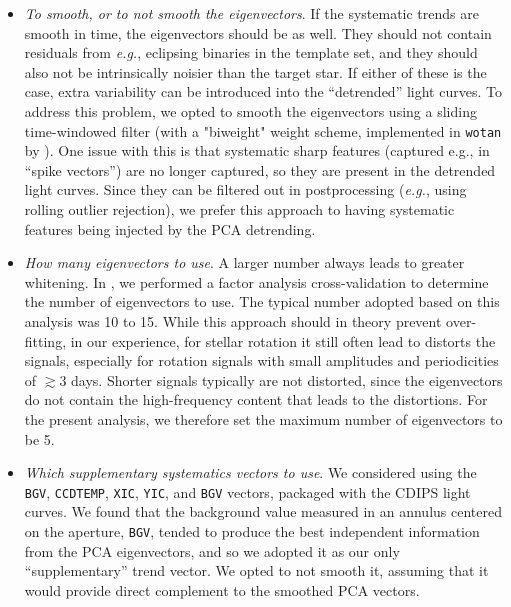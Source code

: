 \documentclass[12pt,twocolumn,tighten]{aastex63}
\begin{document}
\begin{itemize}
  \item {\it To smooth, or to not smooth the eigenvectors}.
    If the systematic trends are smooth in time, the eigenvectors should be as well. They should not
    contain residuals from {\it e.g.}, eclipsing binaries 
    in the template set, and they should also not be
    intrinsically noisier than the target star. If either of these is
    the case, extra
    variability can be introduced into the ``detrended'' light curves.  To address
    this problem, we opted to smooth the eigenvectors using a
    sliding time-windowed filter (with a "biweight" weight scheme, implemented
    in \texttt{wotan} by \citealt{hippke_wotan_2019}).
    One issue with this is that systematic sharp features (captured
    e.g., in ``spike vectors'') are no longer captured, so they are present
    in the detrended light curves. Since they can be filtered out in postprocessing
    ({\it e.g.}, using rolling outlier rejection), we prefer this
    approach to having systematic features being injected by the
    PCA detrending.
  \item {\it How many eigenvectors to use}.
    A larger number always leads to greater whitening.  In
    \citet{bouma_cdipsI_2019}, we performed a factor analysis
    cross-validation to determine the number of eigenvectors to use.
    The typical number adopted based on this analysis was 10 to 15.
    While this approach should in theory prevent over-fitting, in our
    experience, for stellar rotation it still often lead to distorts
    the signals, especially for rotation signals with small amplitudes
    and periodicities of $\gtrsim 3$ days.  Shorter signals typically
    are not distorted, since the eigenvectors do not contain the
    high-frequency content that leads to the distortions.  For the
    present analysis, we therefore set the maximum number of
    eigenvectors to be 5.
%
  \item {\it Which supplementary systematics vectors to use}.  We
    considered using the \texttt{BGV}, \texttt{CCDTEMP}, \texttt{XIC},
    \texttt{YIC}, and \texttt{BGV} vectors, packaged with the CDIPS
    light curves. We found that the background value measured in an
    annulus centered on the aperture, \texttt{BGV}, tended to produce
    the best independent information from the PCA eigenvectors, and so
    we adopted it as our only ``supplementary'' trend vector.  We
    opted to not smooth it, assuming that it would provide direct
    complement to the smoothed PCA vectors.
\end{itemize}
\end{document}
